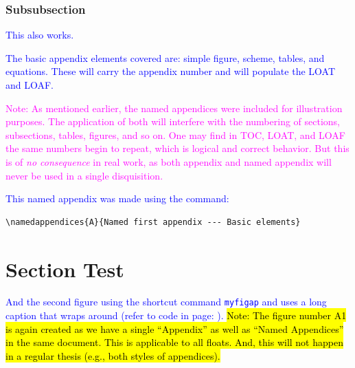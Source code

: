 \documentclass[phd,showframe]{ndsu-thesis-2022}
\newcommand\italk[1]{\textcolor{blue}{#1}}  %
\begin{document}
\subsubsection{Subsubsection}
\italk{This also works.}


\italk{The basic appendix elements covered are: simple figure, scheme, tables, and equations. These will carry the appendix number and will populate the LOAT and LOAF.}

\textcolor{magenta}{Note: As mentioned earlier, the named appendices were included for illustration purposes. The application of both will interfere with the numbering of sections, subsections, tables, figures, and so on. One may find in TOC, LOAT, and LOAF the same numbers begin to repeat, which is logical and correct behavior. But this is of \emph{no consequence} in real work, as both appendix and named appendix will never be used in a single disquisition.}

\italk{This named appendix was made using the command:}

\begin{verbatim}
\namedappendices{A}{Named first appendix --- Basic elements}
\end{verbatim}

\section{Section Test}
\italk{And the second figure using the shortcut command \texttt{myfigap} and uses a long caption that wraps around (refer to code in page: \pageref{figv}).} \hl{Note: The figure number A1 is again created as we have a single ``Appendix'' as well as ``Named Appendices'' in the same document. This is applicable to all floats. And, this will not happen in a regular thesis (e.g., both styles of appendices).}


\kant[1]

\end{document}
